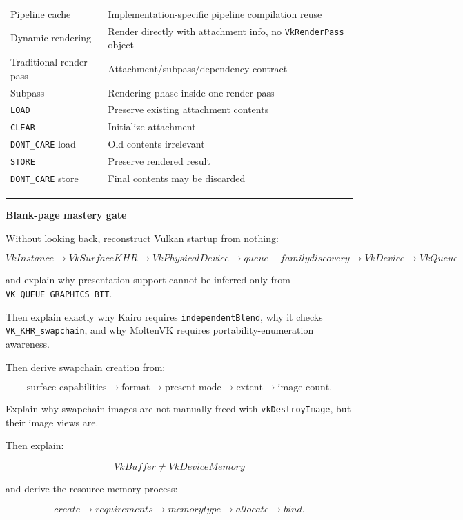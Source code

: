 {\begin{longtable}[]{@{}
  >{\raggedright\arraybackslash}p{}
  >{\raggedright\arraybackslash}p{}@{}}
Pipeline cache & Implementation-specific pipeline compilation reuse \\
Dynamic rendering & Render directly with attachment info, no \texttt{VkRenderPass} object \\
Traditional render pass & Attachment/subpass/dependency contract \\
Subpass & Rendering phase inside one render pass \\
\texttt{LOAD} & Preserve existing attachment contents \\
\texttt{CLEAR} & Initialize attachment \\
\texttt{DONT\_CARE} load & Old contents irrelevant \\
\texttt{STORE} & Preserve rendered result \\
\texttt{DONT\_CARE} store & Final contents may be discarded \\
\end{longtable}
}

\begin{center}\rule{0.5\linewidth}{0.5pt}\end{center}

\textbf{Blank-page mastery gate}

Without looking back, reconstruct Vulkan startup from nothing:

\[
\boxed{
VkInstance
\rightarrow
VkSurfaceKHR
\rightarrow
VkPhysicalDevice
\rightarrow
queue-family discovery
\rightarrow
VkDevice
\rightarrow
VkQueue
}
\]

and explain why presentation support cannot be inferred only from \texttt{VK\_QUEUE\_GRAPHICS\_BIT}.

Then explain exactly why Kairo requires \texttt{independentBlend}, why it checks \texttt{VK\_KHR\_swapchain}, and why MoltenVK requires portability-enumeration awareness.

Then derive swapchain creation from:

\[
\text{surface capabilities}
\rightarrow
\text{format}
\rightarrow
\text{present mode}
\rightarrow
\text{extent}
\rightarrow
\text{image count}.
\]

Explain why swapchain images are not manually freed with \texttt{vkDestroyImage}, but their image views are.

Then explain:

\[
VkBuffer
\neq
VkDeviceMemory
\]

and derive the resource memory process:

\[
create
\rightarrow
requirements
\rightarrow
memory type
\rightarrow
allocate
\rightarrow
bind.
\]

